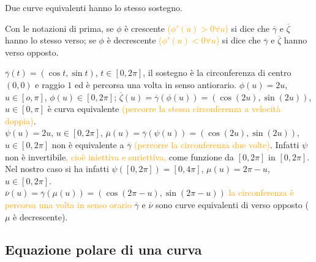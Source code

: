 \begin{attbar}
	Due curve equivalenti hanno lo stesso sostegno.
\end{attbar}


\begin{definition}
	Con le notazioni di prima, se $\phi$ è crescente \textcolor{orange}{($\phi'(u)>0 \forall u$)} si dice che $\overline{\gamma}$ e $\overline{\zeta}$ hanno lo stesso verso; se $\phi$ è decrescente \textcolor{orange}{($\phi'(u)<0 \forall u $)} si dice che $\overline{\gamma}$ e $\overline{\zeta}$ hanno verso opposto.\\

	\segnaposto %
\end{definition}


\begin{exbar}
\begin{example}
	$\overline{\gamma}(t)=(\cos t, \sin t)$, $t\in [0,2\pi]$, il sostegno è la circonferenza di centro $(0,0)$ e raggio $1$ ed è percorsa una volta  in senso antiorario. $\phi(u)=2u$, $u\in [o,\pi]$, $\phi(u)\in[0,2\pi]$; $\overline{\zeta}(u)=\overline{\gamma}(\phi(u))=(\cos (2u),\sin (2u))$, $u \in [0,\pi]$ è curva equivalente \textcolor{orange}{(percorre la stessa circonferenza a velocità doppia)}.\\
	$\psi(u)=2u$, $u \in [0, 2\pi]$, $\overline{\mu}(u)=\overline{\gamma}(\psi(u))=(\cos(2u), \sin (2u))$, $u \in [0,2\pi]$ non è equivalente a $\overline{\gamma}$ \textcolor{orange}{(percorre la circonferenza due volte)}. Infatti $\psi$ non è invertibile\textcolor{orange}{, cioè iniettiva e suriettiva,} come funzione da $[0,2\pi]$ in $[0,2\pi]$. Nel nostro caso si ha infatti $\psi ([0,2\pi])=[0,4\pi]$, $\mu (u)=2\pi-u$, $u \in [0,2\pi]$.\\
	$\overline{\nu}(u)=\overline{\gamma}(\mu(u))=(\cos(2\pi-u),\sin(2\pi-u))$ \textcolor{orange}{ la circonferenza è percorsa una volta in senso orario} $\overline{\gamma}$ e $\overline{\nu}$ sono curve equivalenti di verso opposto ($\mu$ è decrescente).
\end{example}
\end{exbar}


\subsection{Equazione polare di una curva}

